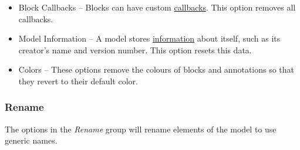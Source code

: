 \documentclass{article}
\begin{document}
\begin{itemize}
	\item Block Callbacks -- Blocks can have custom \href{https://www.mathworks.com/help/simulink/ug/block-callbacks.html}{callbacks}. This option removes all callbacks.
	
	\item Model Information -- A \Simulink model stores \href{https://www.mathworks.com/help/simulink/ug/managing-model-versions.html}{information} about itself, such as its creator's name and version number. This option resets this data.
	
	\item Colors -- These options remove the colours of blocks and annotations so that they revert to their default color.
\end{itemize}

\subsubsection{Rename}
The options in the \emph{Rename} group will rename elements of the model to use generic names.
\end{document}
